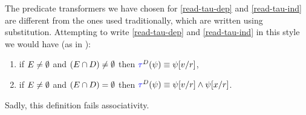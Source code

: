 The predicate transformers we have chosen for \ref{read-tau-dep} and
\ref{read-tau-ind} are different from the ones used traditionally, which are
written using substitution.
Attempting to write \ref{read-tau-dep} and \ref{read-tau-ind} in
this style we would have (as in \cite{DBLP:journals/pacmpl/JagadeesanJR20}):
\begin{enumerate}[topsep=0pt]
\item[{\labeltext[\textsc{r}4a$'$]{(\textsc{r}4a$'$)}{read-tau-dep-p}}]
  if $E\neq\emptyset$ and $(E\cap D)\neq\emptyset$ then
  \begin{math}
    \aTr{\bEvs}{\bForm} \riff    
    \bForm[\aVal/\aReg]
  \end{math},    
\item[{\labeltext[\textsc{r}4b$'$]{(\textsc{r}4b$'$)}{read-tau-ind-p}}]
  if $E\neq\emptyset$ and $(E\cap D)=\emptyset$ then
  \begin{math}
    \aTr{\bEvs}{\bForm} \riff    
    \bForm[\aVal/\aReg]
    \land
    \bForm[\aLoc/\aReg]
  \end{math}.
\end{enumerate}
Sadly, this definition fails associativity.

